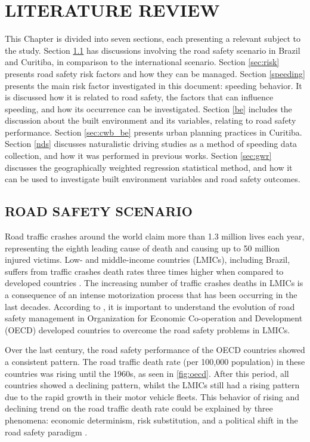 
\chapter{LITERATURE REVIEW} \label{cap:lr}

This Chapter is divided into seven sections, each presenting a relevant subject to the study. Section \ref{sec:rss} has discussions involving the road safety scenario in Brazil and Curitiba, in comparison to the international scenario. Section \ref{sec:risk} presents road safety risk factors and how they can be managed. Section \ref{speeding} presents the main risk factor investigated in this document: speeding behavior. It is discussed how it is related to road safety, the factors that can influence speeding, and how its occurrence can be investigated. Section \ref{be} includes the discussion about the built environment and its variables, relating to road safety performance. Section \ref{sec:cwb_be} presents urban planning practices in Curitiba. Section \ref{nds} discusses naturalistic driving studies as a method of speeding data collection, and how it was performed in previous works. Section \ref{sec:gwr} discusses the geographically weighted regression statistical method, and how it can be used to investigate built environment variables and road safety outcomes.

\section{ROAD SAFETY SCENARIO} \label{sec:rss}

Road traffic crashes around the world claim more than 1.3 million lives each year, representing the eighth leading cause of death and causing up to 50 million injured victims. Low- and middle-income countries (LMICs), including Brazil, suffers from traffic crashes death rates three times higher when compared to developed countries \cite{WHO2018}. The increasing number of traffic crashes deaths in LMICs is a consequence of an intense motorization process that has been occurring in the last decades. According to \textcite{Bhalla2016}, it is important to understand the evolution of road safety management in Organization for Economic Co-operation and Development (OECD) developed countries to overcome the road safety problems in LMICs. 

Over the last century, the road safety performance of the OECD countries showed a consistent pattern. The road traffic death rate (per 100,000 population) in these countries was rising until the 1960s, as seen in \autoref{fig:oecd}. After this period, all countries showed a declining pattern, whilst the LMICs still had a rising pattern due to the rapid growth in their motor vehicle fleets. This behavior of rising and declining trend on the road traffic death rate could be explained by three phenomena: economic determinism, risk substitution, and a political shift in the road safety paradigm \cite{Bhalla2016}.

